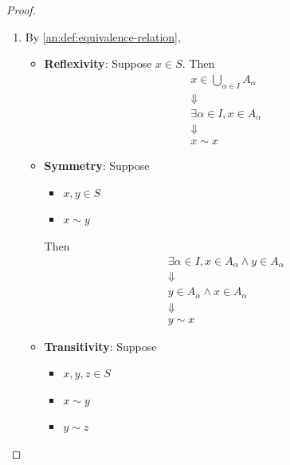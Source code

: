 \begin{proof}
  \leavevmode\par
  \begin{enumerate}[label=\textbf{(\Alph*)}]
    \item By \cref{an:def:equivalence-relation},
          \begin{itemize}
            \item \textbf{Reflexivity}: Suppose $x \in S$. Then
                  \[
                    \begin{array}{c}
                      x \in \bigcup_{\alpha \in I} A_{\alpha} \\
                      \Downarrow                              \\
                      \exists \alpha \in I, x \in A_{\alpha}  \\
                      \Downarrow                              \\
                      x \sim x
                    \end{array}
                  \]
            \item \textbf{Symmetry}: Suppose
                  \begin{itemize}
                    \item $x, y \in S$
                    \item $x \sim y$
                  \end{itemize}
                  Then
                  \[
                    \begin{array}{c}
                      \exists \alpha \in I, x \in A_{\alpha} \land y \in A_{\alpha} \\
                      \Downarrow                                                    \\
                      y \in A_{\alpha} \land x \in A_{\alpha}                       \\
                      \Downarrow                                                    \\
                      y \sim x
                    \end{array}
                  \]
            \item \textbf{Transitivity}: Suppose
                  \begin{itemize}
                    \item $x, y, z \in S$
                    \item $x \sim y$
                    \item $y \sim z$

\end{itemize}
\end{itemize}
\end{enumerate}
\end{proof}
